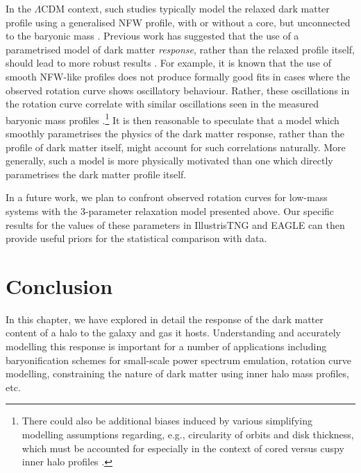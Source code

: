 In the $\Lambda$CDM context, such studies typically model the relaxed dark matter profile using a generalised NFW profile, with or without a core, but unconnected to the baryonic mass \citep[e.g.,][]{llms20}. Previous work has suggested that the use of a parametrised model of dark matter \emph{response}, rather than the relaxed profile itself, should lead to more robust results \citep{2021MNRAS.507..632P,pscs21}. For example, it is known that the use of smooth NFW-like profiles does not produce formally good fits in cases where the observed rotation curve shows oscillatory behaviour. Rather, these oscillations in the rotation curve  correlate with similar oscillations seen in the measured baryonic mass profiles \citep[see, e.g., figs.~4 and~6 of][]{llms20}.\footnote{There could also be additional biases induced by various simplifying modelling assumptions regarding, e.g., circularity of orbits and disk thickness, which must be accounted for especially in the context of cored versus cuspy inner halo profiles \citep[see, e.g., the discussion in][]{roper+22}.} It is then reasonable to speculate that a model which smoothly parametrises the physics of the dark matter response, rather than the profile of dark matter itself, might account for such correlations naturally. More generally, such a model is more physically motivated than one which directly parametrises the dark matter profile itself. 

In a future work, we plan to confront observed rotation curves for low-mass systems with the 3-parameter relaxation model presented above. Our specific results for the values of these parameters in IllustrisTNG and EAGLE can then provide useful priors for the statistical comparison with data.












\section{Conclusion}
\label{sec:conclusion-ch:z0main}
In this chapter, we have explored in detail the response of the dark matter content of a halo to the galaxy and gas it hosts. Understanding and accurately modelling this response is important for a number of applications including baryonification schemes for small-scale power spectrum emulation, rotation curve modelling, %
constraining the nature of dark matter using inner halo mass profiles, etc. 

